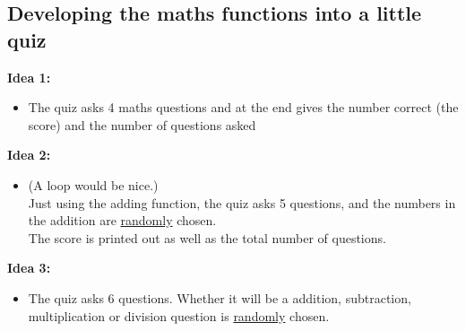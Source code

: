\documentclass[a4paper,12pt]{article}
\begin{document}
\subsection{Developing the maths functions into a little quiz}
\textbf{Idea 1:}
\begin{itemize}
	\item The quiz asks 4 maths questions and at the end gives the number correct (the score) and the number of questions asked
\end{itemize}
\textbf{Idea 2:}
\begin{itemize}
	\item (A loop would be nice.)\\
	Just using the adding function, the quiz asks 5 questions, and the numbers in the addition are \underline{randomly} chosen. \\
	The score is printed out as well as the total number of questions.
\end{itemize}
\textbf{Idea 3:}
\begin{itemize}
	\item The quiz asks 6 questions. Whether it will be a addition, subtraction, multiplication or division question is \underline{randomly} chosen.\\
	
\end{itemize}

\newpage
\end{document}

